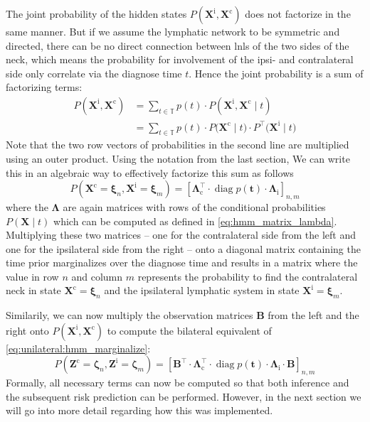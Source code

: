 \documentclass[\relativeRoot/main.tex]{subfiles}
\begin{document}
The joint probability of the hidden states $P \left( \mathbf{X}^\text{i}, \mathbf{X}^\text{c} \right)$ does not factorize in the same manner. But if we assume the lymphatic network to be symmetric and directed, there can be no direct connection between \glspl{lnl} of the two sides of the neck, which means the probability for involvement of the ipsi- and contralateral side only correlate via the diagnose time $t$. Hence the joint probability is a sum of factorizing terms:
%
\begin{equation} \label{eq:bilateral:expand:dissect}
    \begin{aligned}
        P \left( \mathbf{X}^\text{i}, \mathbf{X}^\text{c} \right) &= \sum_{t \in \mathbb{T}}{ p(t) \cdot P \left( \mathbf{X}^\text{i}, \mathbf{X}^\text{c} \mid t \right)} \\
        &= \sum_{t \in \mathbb{T}}{ p(t) \cdot P \big( \mathbf{X}^\text{c} \mid t \big) \cdot P^\top \big( \mathbf{X}^\text{i} \mid t \big)}
    \end{aligned}
\end{equation}
%
Note that the two row vectors of probabilities in the second line are multiplied using an outer product. Using the notation from the last section, We can write this in an algebraic way to effectively factorize this sum as follows
%
\begin{equation} \label{eq:bilateral:expand:algebra}
    P \left( \mathbf{X}^\text{c} = \boldsymbol{\xi}_n, \mathbf{X}^\text{i} = \boldsymbol{\xi}_m \right) = \left[ \boldsymbol{\Lambda}_\text{c}^\top \cdot \operatorname{diag}{p(\mathbf{t})} \cdot \boldsymbol{\Lambda}_\text{i} \right]_{n,m}
\end{equation}
%
where the $\boldsymbol{\Lambda}$ are again matrices with rows of the conditional probabilities $P \left( \mathbf{X} \mid t \right)$ which can be computed as defined in \cref{eq:hmm_matrix_lambda}. Multiplying these two matrices -- one for the contralateral side from the left and one for the ipsilateral side from the right -- onto a diagonal matrix containing the time prior marginalizes over the diagnose time and results in a matrix where the value in row $n$ and column $m$ represents the probability to find the contralateral neck in state $\mathbf{X}^\text{c} = \boldsymbol{\xi}_n$ and the ipsilateral lymphatic system in state $\mathbf{X}^\text{i} = \boldsymbol{\xi}_m$.

Similarily, we can now multiply the observation matrices $\mathbf{B}$ from the left and the right onto $P \left( \mathbf{X}^\text{i}, \mathbf{X}^\text{c} \right)$ to compute the bilateral equivalent of \cref{eq:unilateral:hmm_marginalize}:
%
\begin{equation} \label{eq:bilateral:expand:observation}
    P \left( \mathbf{Z}^\text{c} = \boldsymbol{\zeta}_n, \mathbf{Z}^\text{i} = \boldsymbol{\zeta}_m \right) = \left[ \mathbf{B}^\top \cdot \boldsymbol{\Lambda}_\text{c}^\top \cdot \operatorname{diag}{p(\mathbf{t})} \cdot \boldsymbol{\Lambda}_\text{i} \cdot \mathbf{B} \right]_{n,m}
\end{equation}
%
Formally, all necessary terms can now be computed so that both inference and the subsequent risk prediction can be performed. However, in the next section we will go into more detail regarding how this was implemented.
\end{document}
